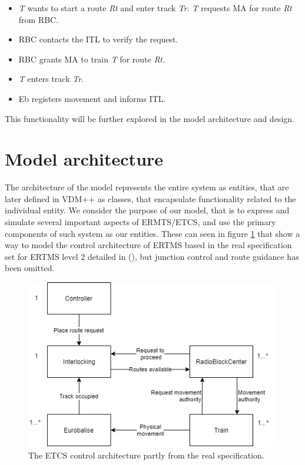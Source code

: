 \documentclass[preprint,12pt]{elsarticle}
\begin{document}
\begin{itemize}[noitemsep]
	\item \textit{T} wants to start a route \textit{Rt} and enter track \textit{Tr}. \textit{T} requests MA for route \textit{Rt} from RBC.
	\item RBC contacts the ITL to verify the request.
	\item RBC grants MA to train \textit{T} for route \textit{Rt}.
	\item \textit{T} enters track \textit{Tr}.
	\item Eb registers movement and informs ITL.
\end{itemize}

This functionality will be further explored in the model architecture and design.

\section{Model architecture}
\label{S:systemarch}

The architecture of the model represents the entire system as entities, that are later defined in VDM++ as classes, that encapsulate functionality related to the individual entity. We consider the purpose of our model, that is to express and simulate several important aspects of ERMTS/ETCS, and use the primary components of such system as our entities. These can seen in figure \ref{fig:ertmscontrolarchitecture} that show a way to model the control architecture of ERTMS based in the real specification set for ERTMS level 2 detailed in (\citet{Berger2018}), but junction control and route guidance has been omitted.

\begin{figure}[h]
	\centering
	\includegraphics[width=0.8\linewidth]{ERTMSControl.png}
	\caption{The ETCS control architecture partly from the real specification.}
	\label{fig:ertmscontrolarchitecture}
\end{figure}
\end{document}
